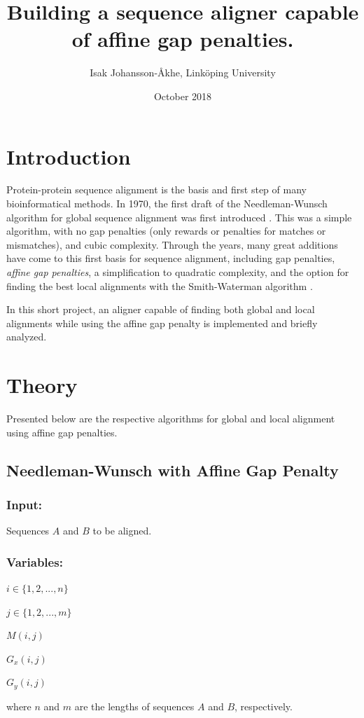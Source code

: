 \documentclass{article}
\title{Building a sequence aligner capable of affine gap penalties.}
\date{October 2018}
\author{Isak Johansson-\AA{}khe, Linköping University}
\begin{document}
\maketitle

\section*{Introduction}
Protein-protein sequence alignment is the basis and first step of many bioinformatical methods. In 1970, the first draft of the Needleman-Wunsch algorithm for global sequence alignment was first introduced \cite{needleman1970general}. This was a simple algorithm, with no gap penalties (only rewards or penalties for matches or mismatches), and cubic complexity. Through the years, many great additions have come to this first basis for sequence alignment, including gap penalties, \textit{affine gap penalties}, a simplification to quadratic complexity, and the option for finding the best local alignments with the Smith-Waterman algorithm \cite{smith1981comparison}.

In this short project, an aligner capable of finding both global and local alignments while using the affine gap penalty is implemented and briefly analyzed.

\section*{Theory}
Presented below are the respective algorithms for global and local alignment using affine gap penalties.
\subsection*{Needleman-Wunsch with Affine Gap Penalty}
\subsubsection*{Input:}
Sequences $A$ and $B$ to be aligned.

\subsubsection*{Variables:}
\indent\indent
$i \in \{1, 2, ..., n\}$

$j \in \{1, 2, ..., m\}$

$M(i,j)$

$G_{x}(i,j)$

$G_{y}(i,j)$

where $n$ and $m$ are the lengths of sequences $A$ and $B$, respectively.
\end{document}

